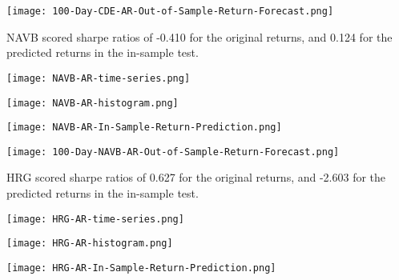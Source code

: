 \begin{center}
    \texttt{[image: 100-Day-CDE-AR-Out-of-Sample-Return-Forecast.png]}
    \label{fig:nonfloat}
\end{center}

NAVB scored sharpe ratios of -0.410 for the original returns, and 0.124 for the predicted returns in the in-sample test.

\begin{center}
    \texttt{[image: NAVB-AR-time-series.png]}
    \label{fig:nonfloat}
\end{center}

\begin{center}
    \texttt{[image: NAVB-AR-histogram.png]}
    \label{fig:nonfloat}
\end{center}

\begin{center}
    \texttt{[image: NAVB-AR-In-Sample-Return-Prediction.png]}
    \label{fig:nonfloat}
\end{center}

\begin{center}
    \texttt{[image: 100-Day-NAVB-AR-Out-of-Sample-Return-Forecast.png]}
    \label{fig:nonfloat}
\end{center}

HRG scored sharpe ratios of 0.627 for the original returns, and -2.603 for the predicted returns in the in-sample test.

\begin{center}  
    \texttt{[image: HRG-AR-time-series.png]}
    \label{fig:nonfloat}
\end{center}

\begin{center}
  
    \texttt{[image: HRG-AR-histogram.png]}
    \label{fig:nonfloat}
\end{center}

\begin{center}
    \texttt{[image: HRG-AR-In-Sample-Return-Prediction.png]}
    \label{fig:nonfloat}
\end{center}

